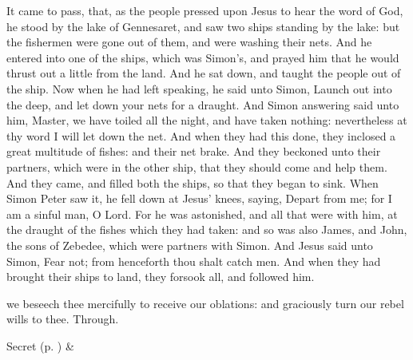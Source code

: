 
\clearpage
{}
 It came to pass, that, as the people pressed upon Jesus to hear the word of God, he stood by the lake of Gennesaret, and saw two ships standing by the lake: but the fishermen were gone out of them, and were washing their nets. And he entered into one of the ships, which was Simon's, and prayed him that he would thrust out a little from the land. And he sat down, and taught the people out of the ship. Now when he had left speaking, he said unto Simon, Launch out into the deep, and let down your nets for a draught. And Simon answering said unto him, Master, we have toiled all the night, and have taken nothing: nevertheless at thy word I will let down the net. And when they had this done, they inclosed a great multitude of fishes: and their net brake. And they beckoned unto their partners, which were in the other ship, that they should come and help them. And they came, and filled both the ships, so that they began to sink. When Simon Peter saw it, he fell down at Jesus' knees, saying, Depart from me; for I am a sinful man, O Lord. For he was astonished, and all that were with him, at the draught of the fishes which they had taken: and so was also James, and John, the sons of Zebedee, which were partners with Simon. And Jesus said unto Simon, Fear not; from henceforth thou shalt catch men. And when they had brought their ships to land, they forsook all, and followed him.


\secret
{} we beseech thee mercifully to receive our oblations: and graciously turn our rebel wills to thee. Through.


\begin{rubric}
     Secret  (p. \pageref{SPSaints}) \&  
\end{rubric}


